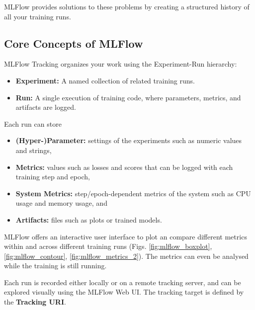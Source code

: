 MLFlow provides solutions to these problems by creating a structured history of all your training runs.

%
\subsection{Core Concepts of MLFlow}

MLFlow Tracking organizes your work using the Experiment-Run hierarchy:

\begin{itemize}
    \item \textbf{Experiment:} A named collection of related training runs.
    \item \textbf{Run:} A single execution of training code, where parameters, metrics, and artifacts are logged.
\end{itemize}

Each run can store
\begin{itemize}
    \item \textbf{(Hyper-)Parameter:} settings of the experiments such as numeric values and strings,
    \item \textbf{Metrics:} values such as losses and scores that can be logged with each training step and epoch,
    \item \textbf{System Metrics:} step/epoch-dependent metrics of the system such as CPU usage and memory usage, and
    \item \textbf{Artifacts:} files such as plots or trained models.
\end{itemize}
MLFlow offers an interactive user interface to plot an compare different metrics within and across different training runs (Figs. \ref{fig:mlflow_boxplot}, \ref{fig:mlflow_contour}, \ref{fig:mlflow_metrics_2}). The metrics can even be analysed while the training is still running.

Each run is recorded either locally or on a remote tracking server, and can be explored visually using the MLFlow Web UI.
The tracking target is defined by the \textbf{Tracking URI}.


